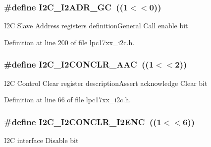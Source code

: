 \subsubsection[{\texorpdfstring{I2\+C\+\_\+\+I2\+A\+D\+R\+\_\+\+GC}{I2C_I2ADR_GC}}]{\setlength{\rightskip}{0pt plus 5cm}\#define I2\+C\+\_\+\+I2\+A\+D\+R\+\_\+\+GC~((1$<$$<$0))}\hypertarget{group___i2_c___private___macros_ga2509515124601141b72080b5daf45009}{}\label{group___i2_c___private___macros_ga2509515124601141b72080b5daf45009}
I2C Slave Address registers definition\+General Call enable bit 

Definition at line 200 of file lpc17xx\+\_\+i2c.\+h.

\subsubsection[{\texorpdfstring{I2\+C\+\_\+\+I2\+C\+O\+N\+C\+L\+R\+\_\+\+A\+AC}{I2C_I2CONCLR_AAC}}]{\setlength{\rightskip}{0pt plus 5cm}\#define I2\+C\+\_\+\+I2\+C\+O\+N\+C\+L\+R\+\_\+\+A\+AC~((1$<$$<$2))}\hypertarget{group___i2_c___private___macros_gaa13b19babb8442aa9047f8ecb92a908d}{}\label{group___i2_c___private___macros_gaa13b19babb8442aa9047f8ecb92a908d}
I2C Control Clear register description\+Assert acknowledge Clear bit 

Definition at line 66 of file lpc17xx\+\_\+i2c.\+h.

\subsubsection[{\texorpdfstring{I2\+C\+\_\+\+I2\+C\+O\+N\+C\+L\+R\+\_\+\+I2\+E\+NC}{I2C_I2CONCLR_I2ENC}}]{\setlength{\rightskip}{0pt plus 5cm}\#define I2\+C\+\_\+\+I2\+C\+O\+N\+C\+L\+R\+\_\+\+I2\+E\+NC~((1$<$$<$6))}\hypertarget{group___i2_c___private___macros_ga92718ac11d46f6e32d526749f09d01b2}{}\label{group___i2_c___private___macros_ga92718ac11d46f6e32d526749f09d01b2}
I2C interface Disable bit 

